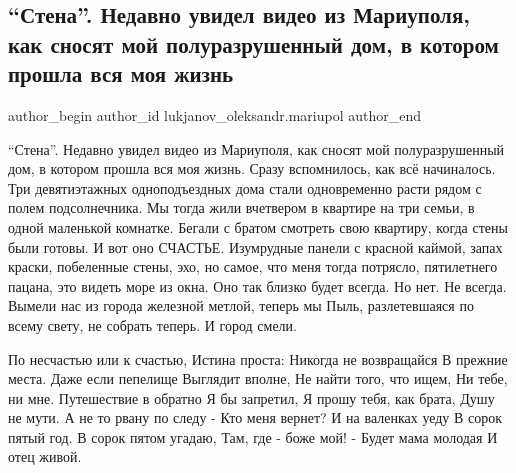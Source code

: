 
 
 
 
 

\subsection{\enquote{Стена}. Недавно увидел видео из Мариуполя, как сносят мой полуразрушенный дом, в котором прошла вся моя жизнь}
\label{sec:08_01_2023.fb.lukjanov_oleksandr.mariupol.1._stena___nedavno_uvi}

\ifcmt
 author_begin
   author_id lukjanov_oleksandr.mariupol
 author_end
\fi

\enquote{Стена}. Недавно увидел видео из Мариуполя, как сносят мой полуразрушенный дом,
в котором прошла вся моя жизнь. Сразу вспомнилось, как всё начиналось. Три
девятиэтажных одноподъездных дома стали одновременно расти рядом с полем
подсолнечника. Мы тогда жили вчетвером в квартире на три семьи, в одной
маленькой комнатке. Бегали с братом смотреть свою квартиру, когда стены были
готовы. И вот оно СЧАСТЬЕ. Изумрудные панели с красной каймой, запах краски,
побеленные стены, эхо, но самое, что меня тогда потрясло, пятилетнего пацана,
это видеть море из окна. Оно так близко будет всегда. Но нет. Не всегда. Вымели
нас из города железной метлой, теперь мы Пыль, разлетевшаяся по всему свету, не
собрать теперь. И город смели.                       

По несчастью или к счастью, Истина проста: Никогда не возвращайся В прежние
места. Даже если пепелище Выглядит вполне, Не найти того, что ищем, Ни тебе, ни
мне. Путешествие в обратно Я бы запретил, Я прошу тебя, как брата, Душу не
мути. А не то рвану по следу - Кто меня вернет? И на валенках уеду В сорок
пятый год. В сорок пятом угадаю, Там, где  - боже мой! - Будет мама молодая И
отец живой.


